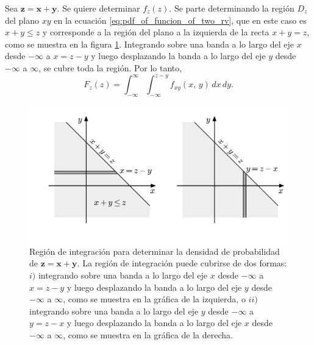 \documentclass[a4paper]{report}
\newcommand{\x}{\mathbf{x}}
\newcommand{\y}{\mathbf{y}}
\newcommand{\z}{\mathbf{z}}
\begin{document}
Sea \(\z=\x+\y\). Se quiere determinar \(f_z(z)\). Se parte determinando la región \(D_z\) del plano \(xy\) en la ecuación \ref{eq:pdf_of_funcion_of_two_rv}, que en este caso es \(x+y\leq z\) y corresponde a la región del plano a la izquierda de la recta \(x+y=z\), como se muestra en la figura \ref{fig:joint_distribution_region_rv_sum}. Integrando sobre una banda a lo largo del eje \(x\) desde \(-\infty\) a \(x=z-y\) y luego desplazando la banda a lo largo del eje \(y\) desde \(-\infty\) a \(\infty\), se cubre toda la región. Por lo tanto,
\[
 F_z(z)=\int_{-\infty}^{\infty}\int_{-\infty}^{z-y}f_{xy}(x,\,y)\,dx\,dy.
\]
\begin{figure}[!htb]
\begin{center}
\includegraphics[width=0.75\columnwidth]{figuras/joint_distribution_region_rv_sum.pdf}
\caption{\label{fig:joint_distribution_region_rv_sum} Región de integración para determinar la densidad de probabilidad de \(\z=\x+\y\). La región de integración puede cubrirse de dos formas: \(i)\) integrando sobre una banda a lo largo del eje \(x\) desde \(-\infty\) a \(x=z-y\) y luego desplazando la banda a lo largo del eje \(y\) desde \(-\infty\) a \(\infty\), como se muestra en la gráfica de la izquierda, o \(ii)\) integrando sobre una banda a lo largo del eje \(y\) desde \(-\infty\) a \(y=z-x\) y luego desplazando la banda a lo largo del eje \(x\) desde \(-\infty\) a \(\infty\), como se muestra en la gráfica de la derecha.}
\end{center}
\end{figure}
\end{document}
